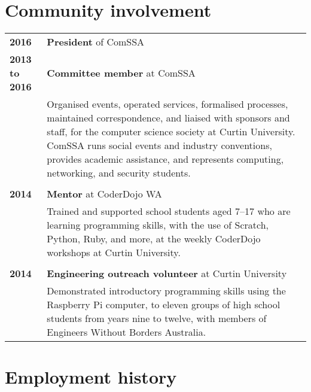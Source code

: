 \documentclass[a4paper,12pt]{article}
\begin{document}
\section*{Community involvement}

\begin{tabular}{p{35mm}p{125mm}}
	                    \textbf{2016}               & \textbf{President} of ComSSA
	\vspace{0.2em}  \\  \textbf{2013 to 2016}       & \textbf{Committee member} at ComSSA
	\vspace{0.2em}  \\                              & Organised events, operated services, formalised processes, maintained correspondence, and liaised with sponsors and staff, for the computer science society at Curtin University. ComSSA runs social events and industry conventions, provides academic assistance, and represents computing, networking, and security students.
	\\              \\  \textbf{2014}               & \textbf{Mentor} at CoderDojo WA
	\vspace{0.2em}  \\                              & Trained and supported school students aged 7--17 who are learning programming skills, with the use of Scratch, Python, Ruby, and more, at the weekly CoderDojo workshops at Curtin University.
	\\              \\  \textbf{2014}               & \textbf{Engineering outreach volunteer} at Curtin University
	\vspace{0.2em}  \\                              & Demonstrated introductory programming skills using the Raspberry Pi computer, to eleven groups of high school students from years nine to twelve, with members of Engineers Without Borders Australia.
\end{tabular}

\section*{Employment history}
\end{document}
